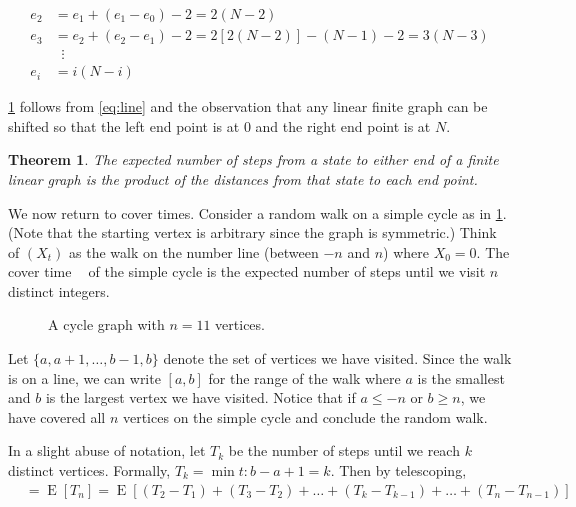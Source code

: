 \documentclass[12pt]{article}
\newtheorem{theorem}{Theorem}
\theoremstyle{definition}
\DeclareMathOperator{\E}{\mathrm{E}}		%
\DeclareMathOperator{\cov}{t_\textrm{cov}}  %
\begin{document}
\begin{align}
e_2  &= e_1 + (e_1 - e_0) - 2 = 2 (N - 2) \nonumber\\
e_3  &= e_2 + (e_2 - e_1) - 2 = 2 \left[2 (N-2) \right] - (N-1) -2 = 3 (N - 3) \nonumber\\
&\;\;\vdots \nonumber\\
e_i &= i (N-i) \label{eq:line}
\end{align}

\cref{thm:line} follows from \cref{eq:line} and the observation that any
linear finite graph can be shifted so that the left end point
is at $0$ and the right end point is at $N$.

\begin{theorem}
The expected number of steps from a state to either end of a finite linear graph
is the product of the distances from that state to each end point.
\label{thm:line}
\end{theorem}

We now return to cover times.
Consider a random walk on a simple cycle as in \cref{fig:cycle}.
(Note that the starting vertex is arbitrary since the graph is symmetric.)
Think of $(X_t)$ as the walk on the number line (between $-n$ and $n$)
where $X_0 = 0$.
The cover time $\cov$ of the simple cycle is the expected number of steps 
until we visit $n$ distinct integers.

\begin{figure}[ht]
	\centering
	\caption{A cycle graph with $n=11$ vertices.}\label{fig:cycle}
\end{figure}

Let $\{a, a+1, \dots, b-1, b\}$ 
denote the set of vertices we have visited.
Since the walk is on a line, we can write $[a,b]$ for the range
of the walk where $a$ is the smallest 
and $b$ is the largest vertex we have visited.
Notice that if $a \leq -n$ or $b \geq n$, we have covered all $n$ vertices
on the simple cycle and conclude the random walk.

In a slight abuse of notation, let $T_k$ be the 
number of steps until we reach $k$ distinct vertices.
Formally, $T_k = \min{t: b-a+1 = k}$.
Then by telescoping,
\begin{align}
\cov &= \E[T_n] = \E[(T_2 - T_1) + (T_3 - T_2) + \dots + 
(T_k - T_{k-1}) + \dots + (T_n - T_{n-1})] \nonumber
\end{align}
\end{document}

